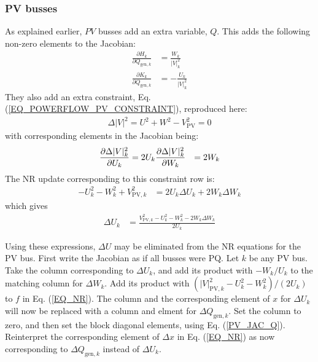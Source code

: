 \documentclass[11pt]{article}
\newcommand{\Vr}{\ensuremath{U}}
\newcommand{\Vi}{\ensuremath{W}}
\newcommand{\Ir}{\ensuremath{H}}
\newcommand{\Ii}{\ensuremath{K}}
\begin{document}
\subsubsection{PV busses}
As explained earlier, $PV$ busses add an extra variable, $Q$. This adds the following non-zero elements to the Jacobian:
\begin{align}
\frac{\partial \Ir_k}{\partial Q_{\text{gen},k}} &= \frac{\Vi_k}{|V|_k^2} \\
\frac{\partial \Ii_k}{\partial Q_{\text{gen},k}} &= -\frac{\Vr_k}{|V|_k^2}
\end{align}
They also add an extra constraint, Eq. (\ref{EQ_POWERFLOW_PV_CONSTRAINT}), reproduced here:
\begin{align}
\Delta |V|^2 = \Vr^2 + \Vi^2 - V_\text{PV}^2 = 0
\label{EQ_POWERFLOW_PV_CONSTRAINT_AGAIN}
\end{align}
with corresponding elements in the Jacobian being:
\begin{align}
\frac{\partial \Delta|V|^2_k}{\partial \Vr_k} &= 2 \Vr_k \notag
\frac{\partial \Delta|V|^2_k}{\partial \Vi_k} &= 2 \Vi_k
\label{EQ_PV_JAC_Q}
\end{align}
The NR update corresponding to this constraint row is:
\begin{align}
	-\Vr_k^2 - \Vi_k^2 + V_{\text{PV},k}^2 &= 2\Vr_k\Delta\Vr_k + 2\Vi_k\Delta\Vi_k
\end{align}
which gives
\begin{align}
\Delta \Vr_k &= \frac{V^2_{\text{PV},k} - \Vr_k^2 - \Vi_k^2- 2\Vi_k\Delta \Vi_k}{2\Vr_k}
\end{align}

Using these expressions, $\Delta \Vr$ may be eliminated from the NR equations for the PV bus. First write the Jacobian as if all busses were PQ. Let $k$ be any PV bus. Take the column corresponding to $\Delta \Vr_k$, and add its product with $-\Vi_k/\Vr_k$ to the matching column for  $\Delta \Vi_k$. Add its product with $(|V|^2_{\text{PV},k} - \Vr_k^2 - \Vi_k^2)/(2\Vr_k)$ to $f$ in Eq. (\ref{EQ_NR}). The column and the corresponding element of $x$ for $\Delta \Vr_k$ will now be replaced with a column and elment for $\Delta Q_{\text{gen},k}$. Set the column to zero, and then set the block diagonal elements, using Eq. (\ref{PV_JAC_Q}). Reinterpret the corresponding element of $\Delta x$ in Eq. (\ref{EQ_NR}) as now corresponding to $\Delta Q_{\text{gen},k}$ instead of $\Delta \Vr_k$.
\end{document}
